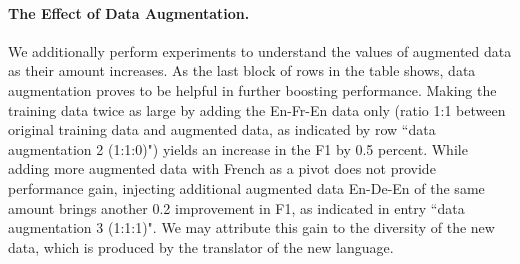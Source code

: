 \documentclass{article} \usepackage{iclr2018_conference,times}
\begin{document}
\paragraph{The Effect of Data Augmentation.}
We additionally perform experiments to understand the values of augmented data as their amount increases. As the last block of rows in the table shows, data augmentation proves to be helpful in further boosting performance. Making the training data twice as large by adding the En-Fr-En data only (ratio 1:1 between original training data and augmented data, as indicated by row ``data augmentation  2 (1:1:0)") yields an increase in the F1 by 0.5 percent. 
While adding more augmented data with French as a pivot does not provide performance gain, injecting additional augmented data En-De-En of the same amount brings another 0.2 improvement in F1, as indicated in entry ``data augmentation  3 (1:1:1)". We may attribute this gain to the diversity of the new data, which is produced by the translator of the new language.
\end{document}
